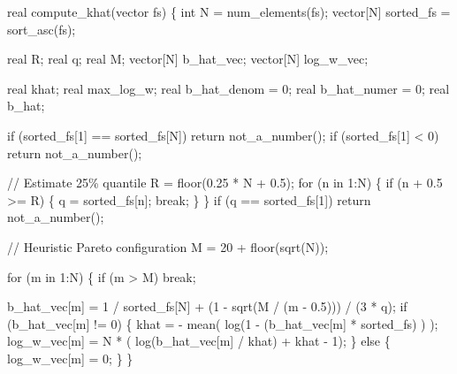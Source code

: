 \documentclass[
  letterpaper,
  DIV=11,
  numbers=noendperiod]{scrartcl}
\newenvironment{Shaded}{\begin{snugshade}}{\end{snugshade}}
\newcommand{\CommentTok}[1]{\textcolor[rgb]{0.37,0.37,0.37}{#1}}
\newcommand{\ControlFlowTok}[1]{\textcolor[rgb]{0.00,0.23,0.31}{#1}}
\newcommand{\DataTypeTok}[1]{\textcolor[rgb]{0.68,0.00,0.00}{#1}}
\newcommand{\DecValTok}[1]{\textcolor[rgb]{0.68,0.00,0.00}{#1}}
\newcommand{\FloatTok}[1]{\textcolor[rgb]{0.68,0.00,0.00}{#1}}
\newcommand{\NormalTok}[1]{\textcolor[rgb]{0.00,0.23,0.31}{#1}}
\begin{document}
\begin{codelisting}
\begin{Shaded}
\begin{Highlighting}[]
  \DataTypeTok{real}\NormalTok{ compute\_khat(}\DataTypeTok{vector}\NormalTok{ fs) \{}
    \DataTypeTok{int}\NormalTok{ N = num\_elements(fs);}
    \DataTypeTok{vector}\NormalTok{[N] sorted\_fs = sort\_asc(fs);}

    \DataTypeTok{real}\NormalTok{ R;}
    \DataTypeTok{real}\NormalTok{ q;}
    \DataTypeTok{real}\NormalTok{ M;}
    \DataTypeTok{vector}\NormalTok{[N] b\_hat\_vec;}
    \DataTypeTok{vector}\NormalTok{[N] log\_w\_vec;}

    \DataTypeTok{real}\NormalTok{ khat;}
    \DataTypeTok{real}\NormalTok{ max\_log\_w;}
    \DataTypeTok{real}\NormalTok{ b\_hat\_denom = }\DecValTok{0}\NormalTok{;}
    \DataTypeTok{real}\NormalTok{ b\_hat\_numer = }\DecValTok{0}\NormalTok{;}
    \DataTypeTok{real}\NormalTok{ b\_hat;}

    \ControlFlowTok{if}\NormalTok{ (sorted\_fs[}\DecValTok{1}\NormalTok{] == sorted\_fs[N]) }\ControlFlowTok{return}\NormalTok{ not\_a\_number();}
    \ControlFlowTok{if}\NormalTok{ (sorted\_fs[}\DecValTok{1}\NormalTok{] \textless{} }\DecValTok{0}\NormalTok{) }\ControlFlowTok{return}\NormalTok{ not\_a\_number();}

    \CommentTok{// Estimate 25\% quantile}
\NormalTok{    R = floor(}\FloatTok{0.25}\NormalTok{ * N + }\FloatTok{0.5}\NormalTok{);}
    \ControlFlowTok{for}\NormalTok{ (n }\ControlFlowTok{in} \DecValTok{1}\NormalTok{:N) \{}
      \ControlFlowTok{if}\NormalTok{ (n + }\FloatTok{0.5}\NormalTok{ \textgreater{}= R) \{}
\NormalTok{        q = sorted\_fs[n];}
        \ControlFlowTok{break}\NormalTok{;}
\NormalTok{      \}}
\NormalTok{    \}}
    \ControlFlowTok{if}\NormalTok{ (q == sorted\_fs[}\DecValTok{1}\NormalTok{]) }\ControlFlowTok{return}\NormalTok{ not\_a\_number();}

    \CommentTok{// Heuristic Pareto configuration}
\NormalTok{    M = }\DecValTok{20}\NormalTok{ + floor(sqrt(N));}

    \ControlFlowTok{for}\NormalTok{ (m }\ControlFlowTok{in} \DecValTok{1}\NormalTok{:N) \{}
      \ControlFlowTok{if}\NormalTok{ (m \textgreater{} M) }\ControlFlowTok{break}\NormalTok{;}

\NormalTok{      b\_hat\_vec[m] = }\DecValTok{1}\NormalTok{ / sorted\_fs[N] + (}\DecValTok{1}\NormalTok{ {-} sqrt(M / (m {-} }\FloatTok{0.5}\NormalTok{))) / (}\DecValTok{3}\NormalTok{ * q);}
      \ControlFlowTok{if}\NormalTok{ (b\_hat\_vec[m] != }\DecValTok{0}\NormalTok{) \{}
\NormalTok{        khat = {-} mean( log(}\DecValTok{1}\NormalTok{ {-} (b\_hat\_vec[m] * sorted\_fs) ) );}
\NormalTok{        log\_w\_vec[m] = N * ( log(b\_hat\_vec[m] / khat) + khat {-} }\DecValTok{1}\NormalTok{);}
\NormalTok{      \} }\ControlFlowTok{else}\NormalTok{ \{}
\NormalTok{        log\_w\_vec[m] = }\DecValTok{0}\NormalTok{;}
\NormalTok{      \}}
\NormalTok{    \}}


\end{Highlighting}
\end{Shaded}
\end{codelisting}
\end{document}
